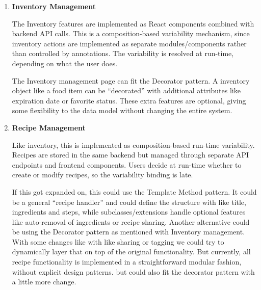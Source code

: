 \begin{enumerate}
    \item \textbf{Inventory Management}
    
    The Inventory features are implemented as React components combined with backend API calls. This is a composition-based variability mechanism, since inventory actions are implemented as separate modules/components rather than controlled by annotations. The variability is resolved at run-time, depending on what the user does.
    
    The Inventory management page can fit the Decorator pattern. A inventory object like a food item can be “decorated” with additional attributes like expiration date or favorite status. These extra features are optional, giving some flexibility to the data model without changing the entire system.
    
    \item \textbf{Recipe Management}
    
    Like inventory, this is implemented as composition-based run-time variability. Recipes are stored in the same backend but managed through separate API endpoints and frontend components. Users decide at run-time whether to create or modify recipes, so the variability binding is late.
    
    If this got expanded on, this could use the Template Method pattern. It could be a general “recipe handler” and could define the structure with like title, ingredients and steps, while subclasses/extensions handle optional features like auto-removal of ingredients or recipe sharing. Another alternative could be using the Decorator pattern as mentioned with Inventory management. With some changes like with like sharing or tagging we could try to dynamically layer that on top of the original functionality. But currently, all recipe functionality is implemented in a straightforward modular fashion, without explicit design patterns. but could also fit the decorator pattern with a little more change.

\end{enumerate}